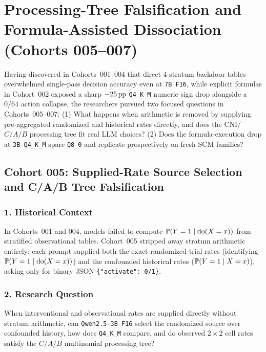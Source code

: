\chapter{Processing-Tree Falsification and Formula-Assisted Dissociation (Cohorts 005--007)}\label{ch:cohorts_005_007}

Having discovered in Cohorts~001--004 that direct 4-stratum backdoor tables overwhelmed single-pass decision accuracy even at \texttt{7B F16}, while explicit formulas in Cohort~002 exposed a sharp $-25\,\mathrm{pp}$ \texttt{Q4\_K\_M} numeric sign drop alongside a $0/64$ action collapse, the researchers pursued two focused questions in Cohorts~005--007: (1) What happens when arithmetic is removed by supplying pre-aggregated randomized and historical rates directly, and does the CNI/$C/A/B$ processing tree fit real LLM choices? (2) Does the formula-execution drop at \texttt{3B Q4\_K\_M} spare \texttt{Q8\_0} and replicate prospectively on fresh SCM families?

\section{Cohort 005: Supplied-Rate Source Selection and C/A/B Tree Falsification}

\subsection*{1. Historical Context}
In Cohorts~001 and 004, models failed to compute $\mathbb{P}(Y=1\mid \operatorname{do}(X=x))$ from stratified observational tables. Cohort~005 stripped away stratum arithmetic entirely: each prompt supplied both the exact randomized-trial rates (identifying $\mathbb{P}(Y=1\mid \operatorname{do}(X=x))$) and the confounded historical rates ($\mathbb{P}(Y=1\mid X=x)$), asking only for binary JSON \texttt{\{"activate": 0/1\}}.

\subsection*{2. Research Question}
When interventional and observational rates are supplied directly without stratum arithmetic, can \texttt{Qwen2.5-3B F16} select the randomized source over confounded history, how does \texttt{Q4\_K\_M} compare, and do observed $2\times 2$ cell rates satisfy the $C/A/B$ multinomial processing tree?

